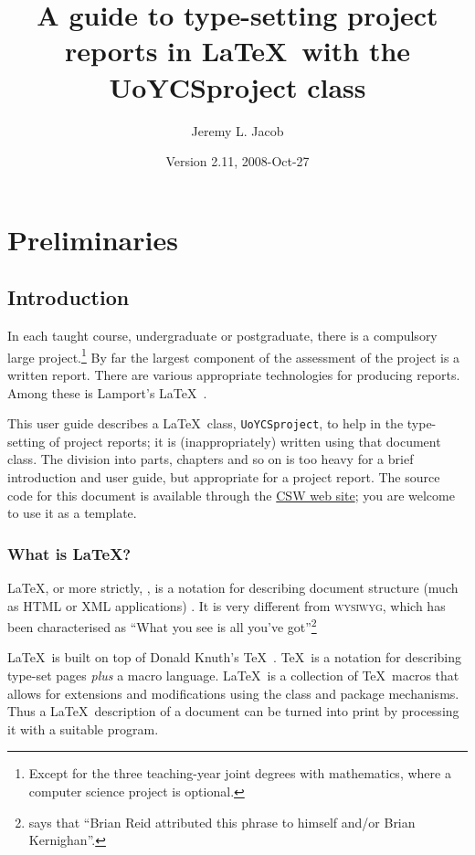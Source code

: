 \documentclass[authoryearcitations]{UoYCSproject}
\author{Jeremy L. Jacob}
\title{A guide to type-setting project reports in \LaTeX\ with the
  \textsf{UoYCSproject} class}
\date{Version 2.11, 2008-Oct-27}
\begin{document}
\maketitle
\listoffigures
\listoftables
\renewcommand*{\lstlistlistingname}{List of Listings}
\lstlistoflistings

\cleardoublepage
\part{Preliminaries}
\label{sec:start}
\thispagestyle{empty}\cleardoublepage

\chapter{Introduction}
\label{cha:Introduction}

In each taught course, undergraduate or postgraduate, there is a
compulsory large project.\footnote{Except for the three teaching-year
  joint degrees with mathematics, where a computer science project is
  optional.}  By far the largest component of the assessment of the
project is a written report.  There are various appropriate
technologies for producing reports.  Among these is Lamport's \LaTeX\ 
\citep{Lamport1994}.

This user guide describes a \LaTeX\ class, \lstinline|UoYCSproject|,
to help in the type-setting of project reports; it is
(inappropriately) written using that document class.  The division
into parts, chapters and so on is too heavy for a brief introduction
and user guide, but appropriate for a project report.  The source code
for this document is available through the
\href{http://www-course.cs.york.ac.uk/csw/}{CSW web site}; you are
welcome to use it as a template.

\section{What is \LaTeX?}
\label{sec:whatislatex}

\LaTeX, or more strictly, \LaTeXe, is a notation for describing
document structure (much as HTML or XML applications)
\citep{Lamport1994}.  It is very different from \textsc{wysiwyg},
which has been characterised as ``What you see is all you've
got''\footnote{\citet[p7, Footnote~1]{Lamport1994} says that ``Brian
  Reid attributed this phrase to himself and/or Brian Kernighan''.}

\LaTeX\ is built on top of Donald Knuth's \TeX\ \citep{Knuth1984}.
\TeX\ is a notation for describing type-set pages \emph{plus} a macro
language.  \LaTeX\ is a collection of \TeX\ macros that allows for
extensions and modifications using the class and package mechanisms.
Thus a \LaTeX\ description of a document can be turned into print by
processing it with a suitable program.
\end{document}
